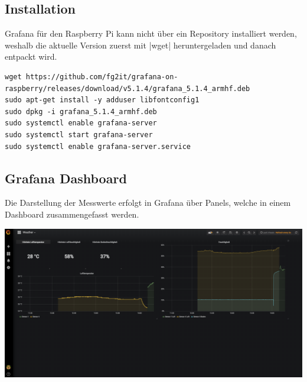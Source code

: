 \documentclass[
  12pt, %
  a4paper, %
  twoside, %
  openany, %
  numbers=noenddot, %
  BCOR=5mm, %
  parskip=half*, %
  thesis, %
]{bfhbook}
\begin{document}
\subsection{Installation}
Grafana für den Raspberry Pi kann nicht über ein Repository installiert werden, weshalb die aktuelle Version zuerst mit |wget| heruntergeladen und danach entpackt wird.
 \begin{verbatim}
wget https://github.com/fg2it/grafana-on-raspberry/releases/download/v5.1.4/grafana_5.1.4_armhf.deb
sudo apt-get install -y adduser libfontconfig1
sudo dpkg -i grafana_5.1.4_armhf.deb
sudo systemctl enable grafana-server
sudo systemctl start grafana-server
sudo systemctl enable grafana-server.service
   \end{verbatim}
   \subsection{Grafana Dashboard}
Die Darstellung der Messwerte erfolgt in Grafana über Panels, welche in einem Dashboard \cite{grafanaDashboard} zusammengefasst werden.
\begin{center}
   \includegraphics[width=17cm]{Bilder/Grafana-Dashboard.PNG}
   \captionsetup{justification=centering}
\end{center}
\end{document}
